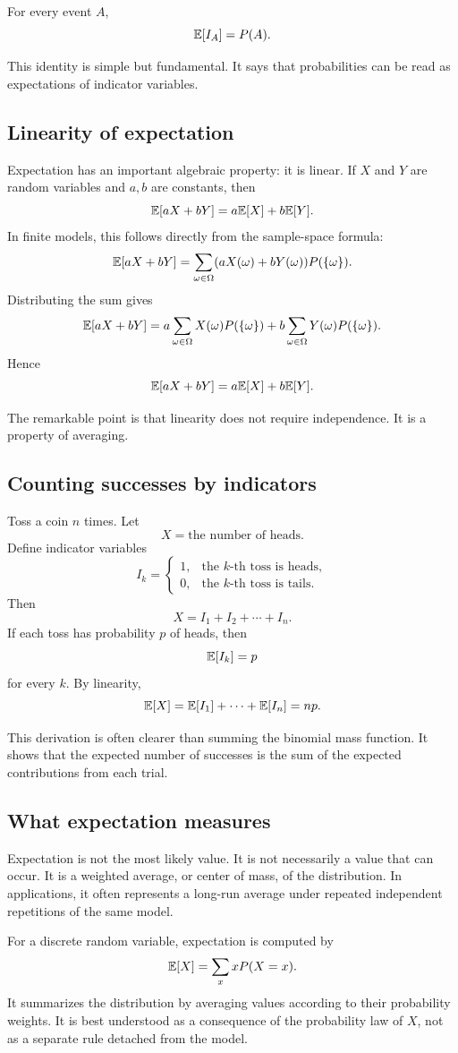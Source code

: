 \begin{theorembox}
For every event \(A\),
\[
\mathbb{E}[I_A]=P(A).
\]
\end{theorembox}

This identity is simple but fundamental. It says that probabilities can be read
as expectations of indicator variables.

\subsection*{Linearity of expectation}

Expectation has an important algebraic property: it is linear. If \(X\) and
\(Y\) are random variables and \(a,b\) are constants, then
\[
\mathbb{E}[aX+bY]=a\mathbb{E}[X]+b\mathbb{E}[Y].
\]
In finite models, this follows directly from the sample-space formula:
\[
\mathbb{E}[aX+bY]
=
\sum_{\omega\in\Omega}(aX(\omega)+bY(\omega))P(\{\omega\}).
\]
Distributing the sum gives
\[
\mathbb{E}[aX+bY]
=
a\sum_{\omega\in\Omega}X(\omega)P(\{\omega\})
+
b\sum_{\omega\in\Omega}Y(\omega)P(\{\omega\}).
\]
Hence
\[
\mathbb{E}[aX+bY]=a\mathbb{E}[X]+b\mathbb{E}[Y].
\]

The remarkable point is that linearity does not require independence. It is a
property of averaging.

\subsection*{Counting successes by indicators}

Toss a coin \(n\) times. Let
\[
X=\text{the number of heads}.
\]
Define indicator variables
\[
I_k=
\begin{cases}
1, & \text{the }k\text{-th toss is heads},\\
0, & \text{the }k\text{-th toss is tails}.
\end{cases}
\]
Then
\[
X=I_1+I_2+\cdots+I_n.
\]
If each toss has probability \(p\) of heads, then
\[
\mathbb{E}[I_k]=p
\]
for every \(k\). By linearity,
\[
\mathbb{E}[X]=\mathbb{E}[I_1]+\cdots+\mathbb{E}[I_n]=np.
\]

This derivation is often clearer than summing the binomial mass function. It
shows that the expected number of successes is the sum of the expected
contributions from each trial.

\subsection*{What expectation measures}

Expectation is not the most likely value. It is not necessarily a value that can
occur. It is a weighted average, or center of mass, of the distribution. In
applications, it often represents a long-run average under repeated independent
repetitions of the same model.

\begin{summarybox}
For a discrete random variable, expectation is computed by
\[
\mathbb{E}[X]=\sum_x xP(X=x).
\]
It summarizes the distribution by averaging values according to their
probability weights. It is best understood as a consequence of the probability
law of \(X\), not as a separate rule detached from the model.
\end{summarybox}

